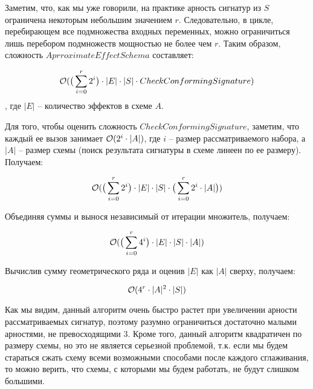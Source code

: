 Заметим, что, как мы уже говорили, на практике арность сигнатур из $S$ ограничена некоторым небольшим значением $r$. Следовательно, в цикле, перебирающем все подмножества входных переменных, можно ограничиться лишь перебором подмножеств мощностью не более чем $r$. Таким образом, сложность $AprroximateEffectSchema$ составляет:

$$\mathcal{O}(\big(\sum \limits_{i = 0}^r 2^{i}\big) \cdot |E| \cdot |S| \cdot CheckConformingSignature)$$, где $|E|$ -- количество эффектов в схеме $A$.

Для того, чтобы оценить сложность $CheckConformingSignature$, заметим, что каждый ее вызов занимает $\mathcal{O}(2^i \cdot |A|)$, где $i$ -- размер рассматриваемого набора, а $|A|$ -- размер схемы (поиск результата сигнатуры в схеме линеен по ее размеру). Получаем:

$$\mathcal{O}(\big(\sum \limits_{i = 0}^r 2^{i}\big) \cdot |E| \cdot |S| \cdot \big(\sum \limits_{i = 0}^r 2^{i} \cdot |A| \big))$$

Объединяя суммы и вынося независимый от итерации множитель, получаем:

$$\mathcal{O}(\big(\sum \limits_{i = 0}^r 4^{i}\big) \cdot |E| \cdot |S| \cdot |A| )$$

Вычислив сумму геометрического ряда и оценив $|E|$ как $|A|$ сверху, получаем:

$$\mathcal{O}(4^{r} \cdot |A|^2 \cdot |S| )$$

Как мы видим, данный алгоритм очень быстро растет при увеличении арности рассматриваемых сигнатур, поэтому разумно ограничиться достаточно малыми арностями, не превосходящими 3. Кроме того, данный алгоритм квадратичен по размеру схемы, но это не является серьезной проблемой, т.к. если мы будем стараться сжать схему всеми возможными способами после каждого сглаживания, то можно верить, что схемы, с которыми мы будем работать, не будут слишком большими.